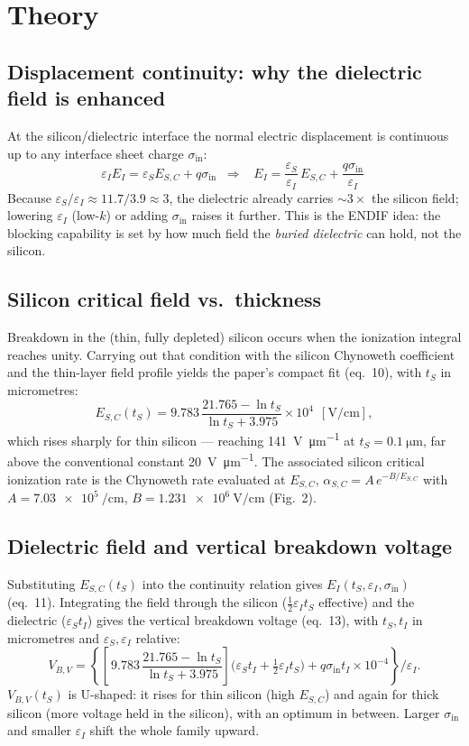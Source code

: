 \documentclass[11pt]{article}
\newcommand{\ESC}{E_{S,C}}
\newcommand{\EI}{E_{I}}
\newcommand{\VBV}{V_{B,V}}
\newcommand{\epsI}{\varepsilon_{I}}
\newcommand{\epsS}{\varepsilon_{S}}
\newcommand{\sigin}{\sigma_{\mathrm{in}}}
\newcommand{\tS}{t_{S}}
\newcommand{\tI}{t_{I}}
\begin{document}
\section{Theory}

\subsection{Displacement continuity: why the dielectric field is enhanced}
At the silicon/dielectric interface the normal electric displacement is continuous
up to any interface sheet charge $\sigin$:
\begin{equation}
\epsI \EI = \epsS \ESC + q\sigin
\;\;\Longrightarrow\;\;
\boxed{\;\EI = \frac{\epsS}{\epsI}\,\ESC + \frac{q\sigin}{\epsI}\;}
\end{equation}
Because $\epsS/\epsI \approx 11.7/3.9 \approx 3$, the dielectric already carries
$\sim\!3\times$ the silicon field; lowering $\epsI$ (low-$k$) or adding $\sigin$
raises it further. This is the ENDIF idea: the blocking capability is set by how
much field the \emph{buried dielectric} can hold, not the silicon.

\subsection{Silicon critical field vs.\ thickness}
Breakdown in the (thin, fully depleted) silicon occurs when the ionization
integral reaches unity. Carrying out that condition with the silicon Chynoweth
coefficient and the thin-layer field profile yields the paper's compact fit
(eq.~10), with $\tS$ in micrometres:
\begin{equation}
\ESC(\tS) = 9.783\,\frac{21.765 - \ln \tS}{\ln \tS + 3.975}\times 10^{4}
\ \ [\si{\volt\per\centi\meter}],
\end{equation}
which rises sharply for thin silicon --- reaching \SI{141}{\volt\per\micro\meter}
at $\tS=\SI{0.1}{\micro\meter}$, far above the conventional constant
\SI{20}{\volt\per\micro\meter}. The associated silicon critical ionization rate is
the Chynoweth rate evaluated at $\ESC$,
$\alpha_{S,C} = A\,e^{-B/\ESC}$ with $A=\SI{7.03e5}{\per\centi\meter}$,
$B=\SI{1.231e6}{\volt\per\centi\meter}$ (Fig.~2).

\subsection{Dielectric field and vertical breakdown voltage}
Substituting $\ESC(\tS)$ into the continuity relation gives $\EI(\tS,\epsI,\sigin)$
(eq.~11). Integrating the field through the silicon ($\tfrac12\epsI\tS$ effective)
and the dielectric ($\epsS\tI$) gives the vertical breakdown voltage (eq.~13), with
$\tS,\tI$ in micrometres and $\epsS,\epsI$ relative:
\begin{equation}
\VBV = \left\{
\left[\,9.783\,\frac{21.765-\ln\tS}{\ln\tS+3.975}\right]
\big(\epsS\tI + \tfrac12\epsI\tS\big)
+ q\sigin\tI\times10^{-4}
\right\}\Big/\epsI .
\end{equation}
$\VBV(\tS)$ is U-shaped: it rises for thin silicon (high $\ESC$) and again for thick
silicon (more voltage held in the silicon), with an optimum in between. Larger
$\sigin$ and smaller $\epsI$ shift the whole family upward.
\end{document}
